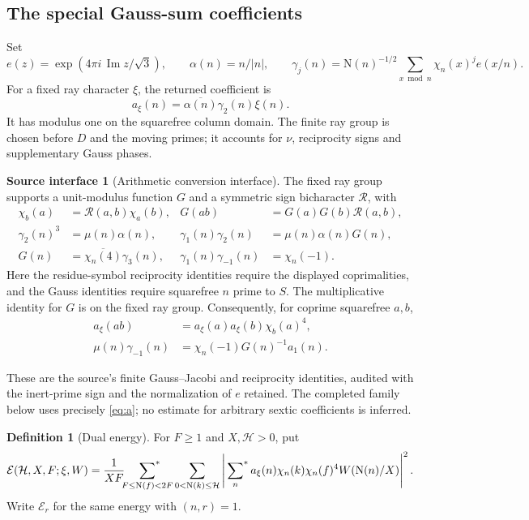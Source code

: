 \documentclass[11pt]{article}
\numberwithin{equation}{section}
\theoremstyle{definition}
\newtheorem{assumption}[theorem]{Source interface}
\newtheorem{definition}[theorem]{Definition}
\theoremstyle{remark}
\newcommand{\E}{\mathcal E}
\newcommand{\N}{\mathrm N}
\newcommand{\sfstar}{\sideset{}{^*}\sum}
\begin{document}
\subsection{The special Gauss-sum coefficients}

Set
\[
 e(z)=\exp(4\pi i\,\operatorname{Im}z/\sqrt3),\qquad
 \alpha(n)=n/|n|,\qquad
 \gamma_j(n)=\N(n)^{-1/2}\sum_{x\bmod n}\chi_n(x)^j e(x/n).
\]
For a fixed ray character \(\xi\), the returned coefficient is
\begin{equation}\label{eq:a}
 a_\xi(n)=\overline{\alpha(n)}\gamma_2(n)\xi(n).
\end{equation}
It has modulus one on the squarefree column domain. The finite
ray group is chosen before \(D\) and the moving primes; it accounts
for \(\nu\), reciprocity signs and supplementary Gauss phases.

\begin{assumption}[Arithmetic conversion interface]\label{in:arith}
The fixed ray group supports a unit-modulus function \(G\) and a
symmetric sign bicharacter \(\mathcal R\), with
\begin{align}
 \chi_b(a)&=\mathcal R(a,b)\chi_a(b),&
 G(ab)&=G(a)G(b)\mathcal R(a,b),\label{eq:recip-audit}\\
 \gamma_2(n)^3&=\mu(n)\alpha(n),&
 \gamma_1(n)\gamma_2(n)&=\mu(n)\alpha(n)G(n),\label{eq:gauss-audit}\\
 G(n)&=\overline{\chi_n(4)}\gamma_3(n),&
 \gamma_1(n)\gamma_{-1}(n)&=\chi_n(-1).
\end{align}
Here the residue-symbol reciprocity identities require the displayed
coprimalities, and the Gauss identities require squarefree \(n\)
prime to \(S\). The multiplicative identity for \(G\) is on the
fixed ray group. Consequently, for coprime squarefree \(a,b\),
\begin{align}
 a_\xi(ab)&=a_\xi(a)a_\xi(b)\chi_b(a)^4,\label{eq:crt-audit}\\
 \mu(n)\gamma_{-1}(n)
 &=\chi_n(-1)G(n)^{-1}a_1(n).\label{eq:conversion}
\end{align}
\end{assumption}

These are the source's finite Gauss--Jacobi and reciprocity
identities, audited with the inert-prime sign and the normalization
of \(e\) retained. The completed family below uses precisely
\eqref{eq:a}; no estimate for arbitrary sextic coefficients is inferred.

\begin{definition}[Dual energy]\label{def:energy}
For \(F\ge1\) and \(X,\mathcal H>0\), put
\begin{equation}\label{eq:energy-audit}
 \E(\mathcal H,X,F;\xi,W)=\frac1{XF}
 \sfstar_{F\le\N(f)<2F}\sum_{0<\N(k)\le\mathcal H}
 \left|\sfstar_n a_\xi(n)\chi_n(k)\chi_n(f)^4W(\N(n)/X)\right|^2.
\end{equation}
Write \(\E_r\) for the same energy with \((n,r)=1\).
\end{definition}
\end{document}
